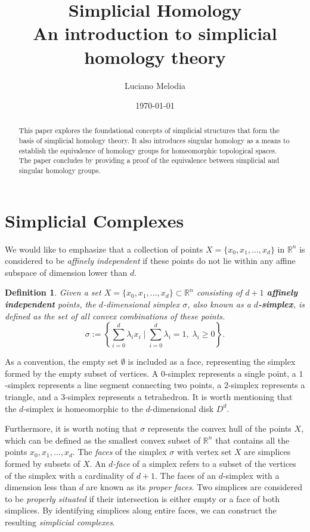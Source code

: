 \documentclass{article}
\title{\textbf{Simplicial Homology} \\[0.2cm] \large An introduction to simplicial homology theory}
\author{Luciano Melodia}
\date{\today}
\newtheorem*{definition}{Definition}
\begin{document}
\maketitle
\begin{abstract}
This paper explores the foundational concepts of simplicial structures that form the basis of simplicial homology theory. It also introduces singular homology as a means to establish the equivalence of homology groups for homeomorphic topological spaces. The paper concludes by providing a proof of the equivalence between simplicial and singular homology groups.
\end{abstract}
\tableofcontents

\section{Simplicial Complexes}
We would like to emphasize that a collection of points $X = \{x_0, x_1, \ldots, x_d\}$ in $\mathbb{R}^n$ is considered to be \emph{affinely independent} if these points do not lie within any affine subspace of dimension lower than $d$.

\begin{definition}
Given a set $X = \{x_0, x_1, \ldots, x_d\} \subset \mathbb{R}^n$ consisting of $d+1$ \textbf{affinely independent} points, the $d$-dimensional simplex $\sigma$, also known as a \textbf{\emph{$d$-simplex}}, is defined as the set of all convex combinations of these points.
\begin{equation}
	\sigma := \left\{\sum_{i=0}^{d} \lambda_i x_i \; \vert \; \sum_{i=0}^{d} \lambda_i = 1, \; \lambda_i \geq 0 \right\}.
\end{equation}
\end{definition}

As a convention, the empty set $\emptyset$ is included as a face, representing the simplex formed by the empty subset of vertices. A $0$-simplex represents a single point, a $1$-simplex represents a line segment connecting two points, a $2$-simplex represents a triangle, and a $3$-simplex represents a tetrahedron. It is worth mentioning that the $d$-simplex is homeomorphic to the $d$-dimensional disk $D^d$.

Furthermore, it is worth noting that $\sigma$ represents the convex hull of the points $X$, which can be defined as the smallest convex subset of $\mathbb{R}^n$ that contains all the points $x_0, x_1, \ldots, x_d$. The \emph{faces} of the simplex $\sigma$ with vertex set $X$ are simplices formed by subsets of $X$. An \emph{$d$-face} of a simplex refers to a subset of the vertices of the simplex with a cardinality of $d+1$. The faces of an $d$-simplex with a dimension less than $d$ are known as its \emph{proper faces}. Two simplices are considered to be \emph{properly situated} if their intersection is either empty or a face of both simplices. By identifying simplices along entire faces, we can construct the resulting \emph{simplicial complexes}.
\end{document}
